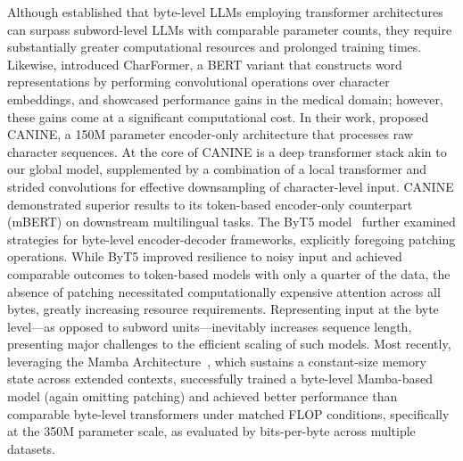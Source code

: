 Although \cite{Choe2019BridgingTG} established that byte-level LLMs employing transformer architectures can surpass subword-level LLMs with comparable parameter counts, they require substantially greater computational resources and prolonged training times. Likewise, \cite{el2020characterbert} introduced CharFormer, a BERT variant that constructs word representations by performing convolutional operations over character embeddings, and showcased performance gains in the medical domain; however, these gains come at a significant computational cost. In their work, \cite{clark2022canine} proposed CANINE, a 150M parameter encoder-only architecture that processes raw character sequences. At the core of CANINE is a deep transformer stack akin to our global model, supplemented by a combination of a local transformer and strided convolutions for effective downsampling of character-level input. CANINE demonstrated superior results to its token-based encoder-only counterpart (mBERT) on downstream multilingual tasks. The ByT5 model~\citep{xue2022byt5} further examined strategies for byte-level encoder-decoder frameworks, explicitly foregoing patching operations. While ByT5 improved resilience to noisy input and achieved comparable outcomes to token-based models with only a quarter of the data, the absence of patching necessitated computationally expensive attention across all bytes, greatly increasing resource requirements. Representing input at the byte level—as opposed to subword units—inevitably increases sequence length, presenting major challenges to the efficient scaling of such models. Most recently, leveraging the Mamba Architecture~\citep{gu2023mamba}, which sustains a constant-size memory state across extended contexts, \cite{wang2024mambabyte} successfully trained a byte-level Mamba-based model (again omitting patching) and achieved better performance than comparable byte-level transformers under matched FLOP conditions, specifically at the 350M parameter scale, as evaluated by bits-per-byte across multiple datasets.

